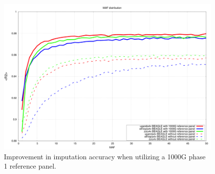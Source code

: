\begin{figure}
\centering
\includegraphics{Chapter2/fig/imp_accu_improv_1000g}
\caption{Improvement in imputation accuracy when utilizing a 1000G phase 1 reference panel.}
\label{fig:imp_accu_improv_1000G}
\end{figure}